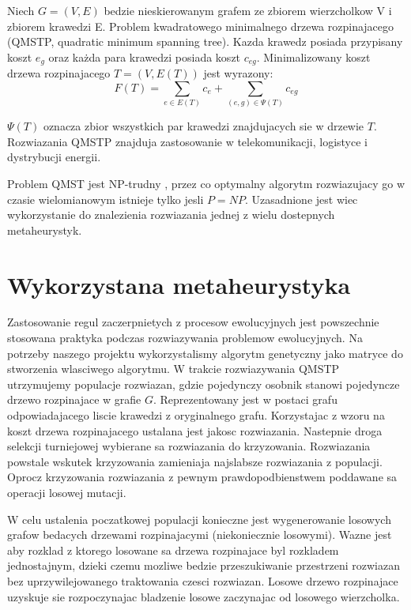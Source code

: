 \documentclass[12pt]{article}
\begin{document}
Niech $G =(V,E)$ bedzie nieskierowanym grafem ze zbiorem wierzcholkow V i zbiorem krawedzi E. Problem kwadratowego minimalnego drzewa rozpinajacego (QMSTP, quadratic minimum spanning tree). Kazda krawedz posiada przypisany koszt $e_{g}$ oraz każda para krawedzi posiada koszt $c_{eg}$. Minimalizowany koszt drzewa rozpinajacego $T= (V, E(T))$ jest wyrazony:
$$ F(T) = \sum_{e \in E(T) } c_e + \sum_{(e,g) \in \Psi (T)} c_{eg} $$

 $\Psi (T)$ oznacza zbior wszystkich par krawedzi znajdujacych sie w drzewie $T$. Rozwiazania QMSTP znajduja zastosowanie w telekomunikacji, logistyce i dystrybucji energii.
 
 Problem QMST jest NP-trudny \cite{Assad}, przez co optymalny algorytm rozwiazujacy go w czasie wielomianowym istnieje tylko jesli $P=NP$. Uzasadnione jest wiec wykorzystanie do znalezienia rozwiazania jednej z wielu dostepnych metaheurystyk.
 
 \section{Wykorzystana metaheurystyka}

Zastosowanie regul zaczerpnietych z procesow ewolucyjnych jest powszechnie stosowana praktyka podczas rozwiazywania problemow ewolucyjnych. Na potrzeby naszego projektu wykorzystalismy algorytm genetyczny jako matryce do stworzenia wlasciwego algorytmu. W trakcie rozwiazywania QMSTP utrzymujemy populacje rozwiazan, gdzie pojedynczy osobnik stanowi pojedyncze drzewo rozpinajace w grafie $G$. Reprezentowany jest w postaci grafu odpowiadajacego liscie krawedzi z oryginalnego grafu. Korzystajac z wzoru na koszt drzewa rozpinajacego ustalana jest jakosc rozwiazania. Nastepnie droga selekcji turniejowej wybierane sa rozwiazania do krzyzowania. Rozwiazania powstale wskutek krzyzowania zamieniaja najslabsze rozwiazania z populacji. Oprocz krzyzowania rozwiazania z pewnym prawdopodbienstwem poddawane sa operacji losowej mutacji.


W celu ustalenia poczatkowej populacji konieczne jest wygenerowanie losowych grafow bedacych drzewami rozpinajacymi (niekoniecznie losowymi). Wazne jest aby rozklad z ktorego losowane sa drzewa rozpinajace byl rozkladem jednostajnym, dzieki czemu mozliwe bedzie przeszukiwanie przestrzeni rozwiazan bez uprzywilejowanego traktowania czesci rozwiazan. Losowe drzewo rozpinajace uzyskuje sie rozpoczynajac bladzenie losowe zaczynajac od losowego wierzcholka. 
\end{document}
